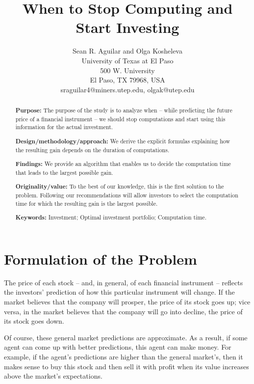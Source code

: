 \documentclass{article}
\begin{document}
\title{When to Stop Computing and Start Investing}
\author{Sean R. Aguilar and Olga Kosheleva\\
		University of Texas at El Paso\\500 W. University\\
		El Paso, TX 79968, USA\\sraguilar4@miners.utep.edu, olgak@utep.edu}
\date{}
\maketitle
	
\begin{abstract}
	\textbf{Purpose:} The purpose of the study is to analyze when --
while predicting the future price of a financial instrument -- we
should stop computations and start using this information for the
actual investment.
	
	\textbf{Design/methodology/approach:} We derive the explicit
formulas explaining how the resulting gain depends on the duration
of computations.

	\textbf{Findings:} We provide an algorithm that enables us to
decide the computation time that leads to the largest possible
gain.
	
	\textbf{Originality/value:} To the best of our knowledge, this
is the first solution to the problem. Following our recommendations
will allow investors to select the computation time for which the
resulting gain is the largest possible.
	
	\textbf{Keywords:} Investment; Optimal investment portfolio;
Computation time.
\end{abstract}
	
\section{Formulation of the Problem}

 The price of each stock --
and, in general, of each financial instrument -- reflects the
investors' prediction of how this particular instrument will
change. If the market believes that the company will prosper, the
price of its stock goes up; vice versa, in the market believes that
the company will go into decline, the price of its stock goes down.

Of course, these general market predictions are approximate. As a
result, if some agent can come up with better predictions, this
agent can make money. For example, if the agent's predictions are
higher than the general market's, then it makes sense to buy this
stock and then sell it with profit when its value increases above
the market's expectations.
\end{document}
